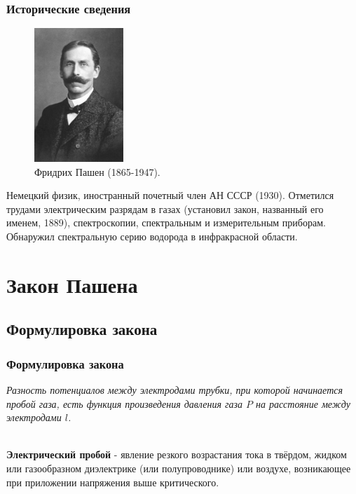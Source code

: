 \documentclass{beamer}
\begin{document}
\begin{frame}
\frametitle{Исторические сведения}
\begin{figure}
	\vspace{-15pt}
	\centering
	\includegraphics[width=0.3\textwidth]{ pics/pashen.jpg}
	\caption{Фридрих Пашен (1865-1947).}
\end{figure}

Немецкий физик, иностранный почетный член АН СССР (1930). Отметился трудами электрическим разрядам в
газах (установил закон, названный его именем, 1889), спектроскопии, спектральным и
измерительным приборам. Обнаружил спектральную серию водорода в инфракрасной области.
\end{frame}


\section{Закон Пашена}
\subsection{Формулировка закона}

\begin{frame}
\frametitle{Формулировка закона}

\textit{Разность потенциалов между электродами трубки, при которой начинается пробой газа, есть
функция произведения давления газа $P$ на расстояние между электродами $l$.}
\\~
\par
\textbf{Электрический пробой} - явление резкого возрастания тока в твёрдом, жидком или
газообразном диэлектрике (или полупроводнике) или воздухе, возникающее при приложении напряжения
выше критического.

\end{frame}
\end{document}
